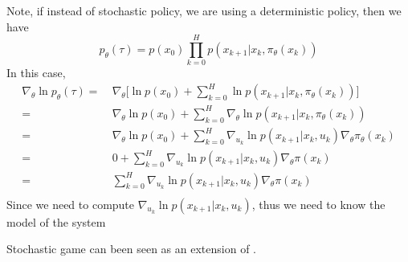 \documentclass[9pt]{article}
\begin{document}
Note, if instead of stochastic policy, we are using a deterministic policy, then we have 
\[
p_{\theta}(\tau) = p(x_0) \prod_{k=0}^{H}p(x_{k+1}|x_k,\pi_{\theta}(x_k))
\]
In this case, 
\[
\begin{split}
\nabla_{\theta} \ln p_{\theta}(\tau) = &\ \nabla_{\theta} \big[ \ln p(x_0) + \sum_{k=0}^{H} \ln p(x_{k+1}|x_k,\pi_{\theta}(x_k))\big]\\
= &\ \nabla_{\theta} \ln p(x_0) + \sum_{k=0}^{H} \nabla_{\theta} \ln p(x_{k+1}|x_k,\pi_{\theta}(x_k))\\
= &\ \nabla_{\theta} \ln p(x_0) + \sum_{k=0}^{H} \nabla_{u_k} \ln p(x_{k+1}|x_k,u_k) \nabla_{\theta} \pi_{\theta}(x_k)\\
= &\ 0 +  \sum_{k=0}^{H} \nabla_{u_k} \ln p(x_{k+1}|x_k,u_k) \nabla_{\theta} \pi(x_k)\\
= &\ \sum_{k=0}^{H} \nabla_{u_k} \ln p(x_{k+1}|x_k,u_k) \nabla_{\theta} \pi(x_k)\\
\end{split}
\]
Since we need to compute $\nabla_{u_k} \ln p(x_{k+1}|x_k,u_k)$, thus we need to know the model of the system




\Working

Stochastic game can been seen as an extension of .






\end{document}
